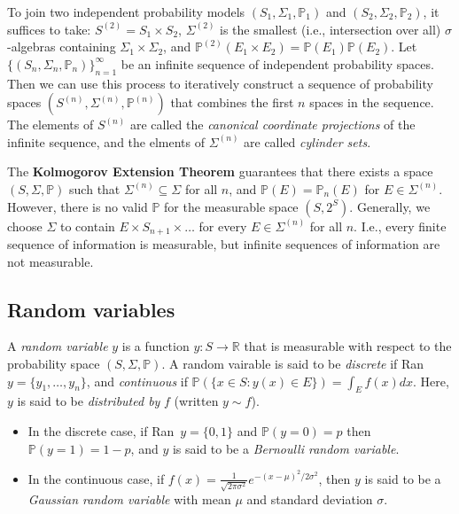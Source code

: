 \documentclass[12pt]{article}
\begin{document}
To join two independent probability models $(S_1, \Sigma_1, \mathbb{P}_1)$
and $(S_2, \Sigma_2, \mathbb{P}_2)$, it suffices to take:
$S^{(2)} = S_1 \times S_2$, $\Sigma^{(2)}$ is the smallest
(i.e., intersection over all) $\sigma$-algebras containing
$\Sigma_1 \times \Sigma_2$, and
$\mathbb{P}^{(2)}(E_1 \times E_2) = \mathbb{P}(E_1)\mathbb{P}(E_2)$.
Let $\{(S_n, \Sigma_n, \mathbb{P}_n)\}_{n=1}^\infty$ be an infinite
sequence of independent probability spaces.
Then we can use this process to iteratively construct a sequence of
probability spaces $(S^{(n)}, \Sigma^{(n)}, \mathbb{P}^{(n)})$
that combines the first $n$ spaces in the sequence.
The elements of $S^{(n)}$ are called the
{\it canonical coordinate projections} of the infinite sequence,
and the elments of $\Sigma^{(n)}$ are called {\it cylinder sets}.

The {\bf Kolmogorov Extension Theorem} guarantees that there exists
a space $(S, \Sigma, \mathbb{P})$ such that $\Sigma^{(n)} \subseteq \Sigma$
for all $n$, and $\mathbb{P}(E) = \mathbb{P}_n(E)$ for $E \in \Sigma^{(n)}$.
However, there is no valid $\mathbb{P}$ for the measurable space
$(S, 2^S)$.
Generally, we choose $\Sigma$ to contain $E \times S_{n+1} \times \ldots$
for every $E \in \Sigma^{(n)}$ for all $n$.
I.e.,  every finite sequence of information is measurable, but
infinite sequences of information are not measurable.

\subsection*{Random variables}

A {\it random variable} $y$ is a function $y : S \rightarrow \mathbb{R}$
that is measurable with respect to the probability space 
$(S, \Sigma, \mathbb{P})$.
A random vairable is said to be {\it discrete} if 
Ran~$y = \{y_1, \ldots, y_n\}$, and {\it continuous} if
$\mathbb{P}(\{x \in S : y(x)\in E\}) = \int_E f(x) dx$.
Here, $y$ is said to be {\it distributed by} $f$ (written $y \sim f$).
\begin{itemize}
\item In the discrete case, if Ran~$y = \{0, 1\}$ and $\mathbb{P}(y=0) = p$
	then $\mathbb{P}(y=1) = 1 - p$, and $y$ is said to be a
	{\it Bernoulli random variable}.
\item In the continuous case, if
	$f(x) = \frac{1}{\sqrt{2\pi\sigma^2}} e^{-(x-\mu)^2/2\sigma^2}$,
	then $y$ is said to be a {\it Gaussian random variable} with
	mean $\mu$ and standard deviation $\sigma$.
\end{itemize}
\end{document}
